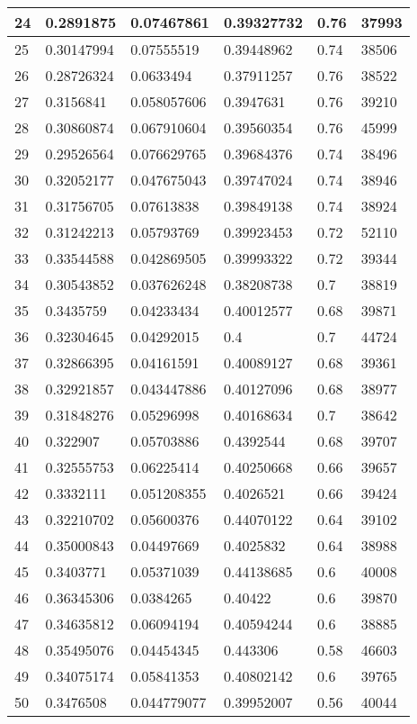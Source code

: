 \begin{longtable}{|l|l|l|l|l|l|}
24 & 0.2891875 & 0.07467861 & 0.39327732 & 0.76 & 37993 \\ \hline 
25 & 0.30147994 & 0.07555519 & 0.39448962 & 0.74 & 38506 \\ \hline 
26 & 0.28726324 & 0.0633494 & 0.37911257 & 0.76 & 38522 \\ \hline 
27 & 0.3156841 & 0.058057606 & 0.3947631 & 0.76 & 39210 \\ \hline 
28 & 0.30860874 & 0.067910604 & 0.39560354 & 0.76 & 45999 \\ \hline 
29 & 0.29526564 & 0.076629765 & 0.39684376 & 0.74 & 38496 \\ \hline 
30 & 0.32052177 & 0.047675043 & 0.39747024 & 0.74 & 38946 \\ \hline 
31 & 0.31756705 & 0.07613838 & 0.39849138 & 0.74 & 38924 \\ \hline 
32 & 0.31242213 & 0.05793769 & 0.39923453 & 0.72 & 52110 \\ \hline 
33 & 0.33544588 & 0.042869505 & 0.39993322 & 0.72 & 39344 \\ \hline 
34 & 0.30543852 & 0.037626248 & 0.38208738 & 0.7 & 38819 \\ \hline 
35 & 0.3435759 & 0.04233434 & 0.40012577 & 0.68 & 39871 \\ \hline 
36 & 0.32304645 & 0.04292015 & 0.4 & 0.7 & 44724 \\ \hline 
37 & 0.32866395 & 0.04161591 & 0.40089127 & 0.68 & 39361 \\ \hline 
38 & 0.32921857 & 0.043447886 & 0.40127096 & 0.68 & 38977 \\ \hline 
39 & 0.31848276 & 0.05296998 & 0.40168634 & 0.7 & 38642 \\ \hline 
40 & 0.322907 & 0.05703886 & 0.4392544 & 0.68 & 39707 \\ \hline 
41 & 0.32555753 & 0.06225414 & 0.40250668 & 0.66 & 39657 \\ \hline 
42 & 0.3332111 & 0.051208355 & 0.4026521 & 0.66 & 39424 \\ \hline 
43 & 0.32210702 & 0.05600376 & 0.44070122 & 0.64 & 39102 \\ \hline 
44 & 0.35000843 & 0.04497669 & 0.4025832 & 0.64 & 38988 \\ \hline 
45 & 0.3403771 & 0.05371039 & 0.44138685 & 0.6 & 40008 \\ \hline 
46 & 0.36345306 & 0.0384265 & 0.40422 & 0.6 & 39870 \\ \hline 
47 & 0.34635812 & 0.06094194 & 0.40594244 & 0.6 & 38885 \\ \hline 
48 & 0.35495076 & 0.04454345 & 0.443306 & 0.58 & 46603 \\ \hline 
49 & 0.34075174 & 0.05841353 & 0.40802142 & 0.6 & 39765 \\ \hline 
50 & 0.3476508 & 0.044779077 & 0.39952007 & 0.56 & 40044 \\ \hline 
\end{longtable}